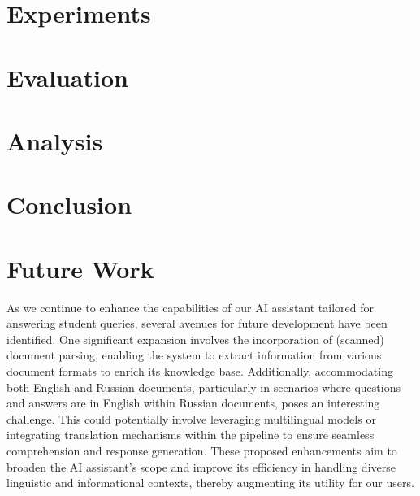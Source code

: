 \documentclass[conference, 11pt]{IEEEtran}
\begin{document}

\section{Experiments}


\section{Evaluation}


\section{Analysis}


\section{Conclusion}


\section{Future Work}

As we continue to enhance the capabilities of our AI assistant tailored for answering student queries, several avenues for future development have been identified. One significant expansion involves the incorporation of (scanned) document parsing, enabling the system to extract information from various document formats to enrich its knowledge base. Additionally, accommodating both English and Russian documents, particularly in scenarios where questions and answers are in English within Russian documents, poses an interesting challenge. This could potentially involve leveraging multilingual models or integrating translation mechanisms within the pipeline to ensure seamless comprehension and response generation. These proposed enhancements aim to broaden the AI assistant's scope and improve its efficiency in handling diverse linguistic and informational contexts, thereby augmenting its utility for our users.




\end{document}
